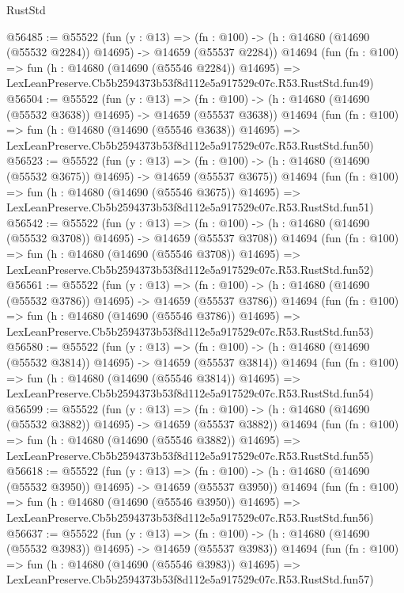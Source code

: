 \begin{lexlean}{RustStd}
\begin{coremodule}
@56485 := @55522
    (fun (y : @13) =>
    (fn : @100) -> (h : @14680 (@14690 (@55532 @2284)) @14695) -> @14659 (@55537 @2284))
    @14694
    (fun (fn : @100) =>
    fun (h : @14680 (@14690 (@55546 @2284)) @14695) =>
    LexLeanPreserve.Cb5b2594373b53f8d112e5a917529c07c.R53.RustStd.fun49)
@56504 := @55522
    (fun (y : @13) =>
    (fn : @100) -> (h : @14680 (@14690 (@55532 @3638)) @14695) -> @14659 (@55537 @3638))
    @14694
    (fun (fn : @100) =>
    fun (h : @14680 (@14690 (@55546 @3638)) @14695) =>
    LexLeanPreserve.Cb5b2594373b53f8d112e5a917529c07c.R53.RustStd.fun50)
@56523 := @55522
    (fun (y : @13) =>
    (fn : @100) -> (h : @14680 (@14690 (@55532 @3675)) @14695) -> @14659 (@55537 @3675))
    @14694
    (fun (fn : @100) =>
    fun (h : @14680 (@14690 (@55546 @3675)) @14695) =>
    LexLeanPreserve.Cb5b2594373b53f8d112e5a917529c07c.R53.RustStd.fun51)
@56542 := @55522
    (fun (y : @13) =>
    (fn : @100) -> (h : @14680 (@14690 (@55532 @3708)) @14695) -> @14659 (@55537 @3708))
    @14694
    (fun (fn : @100) =>
    fun (h : @14680 (@14690 (@55546 @3708)) @14695) =>
    LexLeanPreserve.Cb5b2594373b53f8d112e5a917529c07c.R53.RustStd.fun52)
@56561 := @55522
    (fun (y : @13) =>
    (fn : @100) -> (h : @14680 (@14690 (@55532 @3786)) @14695) -> @14659 (@55537 @3786))
    @14694
    (fun (fn : @100) =>
    fun (h : @14680 (@14690 (@55546 @3786)) @14695) =>
    LexLeanPreserve.Cb5b2594373b53f8d112e5a917529c07c.R53.RustStd.fun53)
@56580 := @55522
    (fun (y : @13) =>
    (fn : @100) -> (h : @14680 (@14690 (@55532 @3814)) @14695) -> @14659 (@55537 @3814))
    @14694
    (fun (fn : @100) =>
    fun (h : @14680 (@14690 (@55546 @3814)) @14695) =>
    LexLeanPreserve.Cb5b2594373b53f8d112e5a917529c07c.R53.RustStd.fun54)
@56599 := @55522
    (fun (y : @13) =>
    (fn : @100) -> (h : @14680 (@14690 (@55532 @3882)) @14695) -> @14659 (@55537 @3882))
    @14694
    (fun (fn : @100) =>
    fun (h : @14680 (@14690 (@55546 @3882)) @14695) =>
    LexLeanPreserve.Cb5b2594373b53f8d112e5a917529c07c.R53.RustStd.fun55)
@56618 := @55522
    (fun (y : @13) =>
    (fn : @100) -> (h : @14680 (@14690 (@55532 @3950)) @14695) -> @14659 (@55537 @3950))
    @14694
    (fun (fn : @100) =>
    fun (h : @14680 (@14690 (@55546 @3950)) @14695) =>
    LexLeanPreserve.Cb5b2594373b53f8d112e5a917529c07c.R53.RustStd.fun56)
@56637 := @55522
    (fun (y : @13) =>
    (fn : @100) -> (h : @14680 (@14690 (@55532 @3983)) @14695) -> @14659 (@55537 @3983))
    @14694
    (fun (fn : @100) =>
    fun (h : @14680 (@14690 (@55546 @3983)) @14695) =>
    LexLeanPreserve.Cb5b2594373b53f8d112e5a917529c07c.R53.RustStd.fun57)

\end{coremodule}
\end{lexlean}
